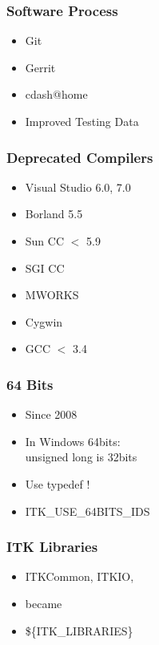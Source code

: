 \begin{frame}
\frametitle{Software Process}
\Huge
\begin{itemize}
\item Git
\pause
\item Gerrit
\pause
\item cdash@home
\pause
\item Improved Testing Data
\end{itemize}
\end{frame}




\begin{frame}
\frametitle{Deprecated Compilers}
\Huge
\begin{itemize}
\item Visual Studio 6.0, 7.0
\pause
\item Borland 5.5
\pause
\item Sun CC $<$ 5.9
\pause
\item SGI CC
\pause
\item MWORKS
\pause
\item Cygwin
\pause
\item GCC $<$ 3.4
\end{itemize}
\end{frame}





\begin{frame}
\frametitle{64 Bits}
\Huge
\begin{itemize}
\item Since 2008
\pause
\item In Windows 64bits:\\unsigned long is 32bits
\pause
\item Use typedef !
\pause
\item ITK\_USE\_64BITS\_IDS
\end{itemize}
\end{frame}


\begin{frame}
\frametitle{ITK Libraries}
\Huge
\begin{itemize}
\item ITKCommon, ITKIO,\cdots
\pause
\item became
\pause
\item \$\{ITK\_LIBRARIES\}
\end{itemize}
\end{frame}
